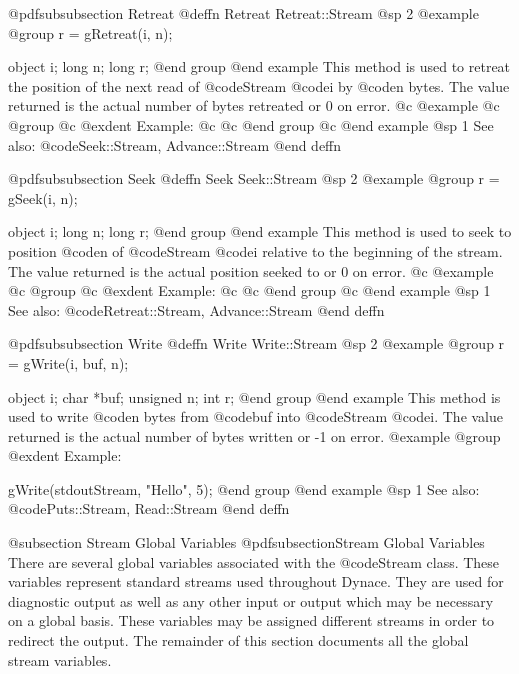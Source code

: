 @pdfsubsubsection {Retreat}
@deffn {Retreat} Retreat::Stream
@sp 2
@example
@group
r = gRetreat(i, n);

object  i;
long    n;
long    r;
@end group
@end example
This method is used to retreat the position of the next
read of @code{Stream} @code{i} by @code{n} bytes.
The value returned is the actual number of bytes retreated or
0 on error.
@c @example
@c @group
@c @exdent Example:
@c  
@c @end group
@c @end example
@sp 1
See also:  @code{Seek::Stream, Advance::Stream}
@end deffn

















@pdfsubsubsection {Seek}
@deffn {Seek} Seek::Stream
@sp 2
@example
@group
r = gSeek(i, n);

object  i;
long    n;
long    r;
@end group
@end example
This method is used to seek to position @code{n} of @code{Stream}
@code{i} relative to the beginning of the stream.
The value returned is the actual position seeked to or 0 on error.
@c @example
@c @group
@c @exdent Example:
@c  
@c @end group
@c @end example
@sp 1
See also:  @code{Retreat::Stream, Advance::Stream}
@end deffn



















@pdfsubsubsection {Write}
@deffn {Write} Write::Stream
@sp 2
@example
@group
r = gWrite(i, buf, n);

object  i;
char    *buf;
unsigned n;
int     r;
@end group
@end example
This method is used to write @code{n} bytes from @code{buf} into
@code{Stream} @code{i}.  The value returned is the actual number
of bytes written or -1 on error.
@example
@group
@exdent Example:
 
gWrite(stdoutStream, "Hello", 5);
@end group
@end example
@sp 1
See also:  @code{Puts::Stream, Read::Stream}
@end deffn




@subsection Stream Global Variables
@pdfsubsection{Stream Global Variables}
There are several global variables associated with the @code{Stream}
class.  These variables represent standard streams used throughout
Dynace.  They are used for diagnostic output as well as any other input
or output which may be necessary on a global basis.  These variables may
be assigned different streams in order to redirect the output.  The
remainder of this section documents all the global stream variables.





